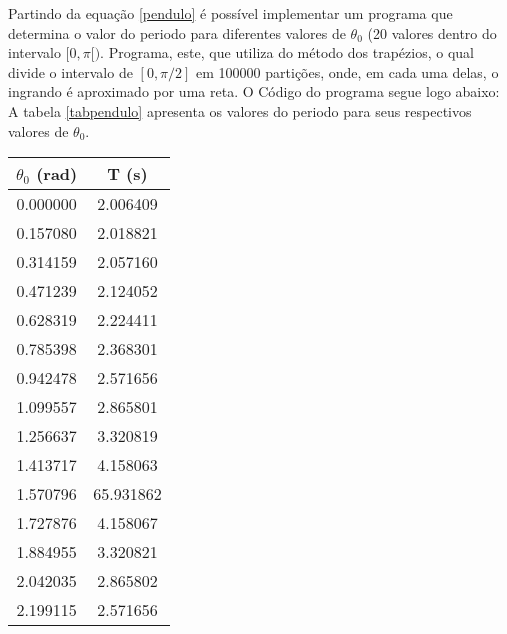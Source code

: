 \documentclass[a4paper,11pt, twoside]{article}
\newcommand{\n}[1]{\textbf{#1}}
\begin{document}
    Partindo da equação \eqref{pendulo} é possível implementar um programa que determina o valor do periodo 
    para diferentes valores de $\theta_0$ (20 valores dentro do intervalo $[0, \pi[)$. Programa, este, que utiliza do método
    dos trapézios, o qual divide o intervalo de $[0, \pi/2]$ em 100000 partições, onde, em cada uma delas,
    o ingrando é aproximado por uma reta. O Código do programa segue logo abaixo:
    {\linespread{1.15}
    }
    \newpage
    A tabela \ref{tabpendulo} apresenta os valores do periodo para seus respectivos valores de $\theta_0$.
    {\linespread{1}
    \begin{table}[!th]
        \begin{center}
            \begin{tabular}{ c c }
                \toprule[0.11em]
                \n{$\theta_0$ (rad)} & \n{T (s)}\\
                \toprule[0.11em]
                0.000000 & 2.006409 \\
                \midrule
                0.157080 & 2.018821 \\
                \midrule
                0.314159 & 2.057160 \\
                \midrule
                0.471239 & 2.124052 \\
                \midrule
                0.628319 & 2.224411 \\
                \midrule
                0.785398 & 2.368301 \\
                \midrule
                0.942478 & 2.571656 \\
                \midrule
                1.099557 & 2.865801 \\
                \midrule
                1.256637 & 3.320819 \\
                \midrule
                1.413717 & 4.158063 \\
                \midrule
                1.570796 & 65.931862 \\
                \midrule
                1.727876 & 4.158067 \\
                \midrule
                1.884955 & 3.320821 \\
                \midrule
                2.042035 & 2.865802 \\
                \midrule
                2.199115 & 2.571656 \\
                \midrule

\end{tabular}
\end{center}
\end{table}}
\end{document}
